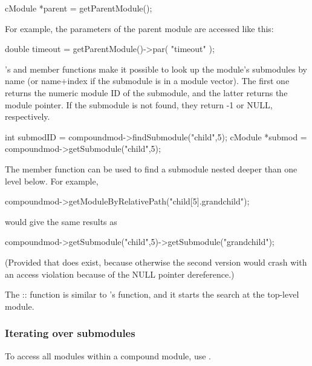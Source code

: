 \begin{cpp}
cModule *parent = getParentModule();
\end{cpp}

For example, the parameters of the parent module are accessed
like this:

\begin{cpp}
double timeout = getParentModule()->par( "timeout" );
\end{cpp}


's  and 
member functions make it possible to look up the module's submodules
by name (or name+index if the submodule
is in a module vector). The first one returns the numeric module ID of
the submodule, and the latter returns the module pointer.  If the
submodule is not found, they return -1 or NULL, respectively.

\begin{cpp}
int submodID = compoundmod->findSubmodule("child",5);
cModule *submod = compoundmod->getSubmodule("child",5);
\end{cpp}


The  member function can be used to find
a submodule nested deeper than one level below. For example,

\begin{cpp}
compoundmod->getModuleByRelativePath("child[5].grandchild");
\end{cpp}

would give the same results as

\begin{cpp}
compoundmod->getSubmodule("child",5)->getSubmodule("grandchild");
\end{cpp}

(Provided that  does exist, because otherwise the second
version would crash with an access violation because of the NULL
pointer dereference.)


The :: function is similar
to 's  function, and it
starts the search at the top-level module.


\subsubsection{Iterating over submodules}


To access all modules within a compound module,
use .

